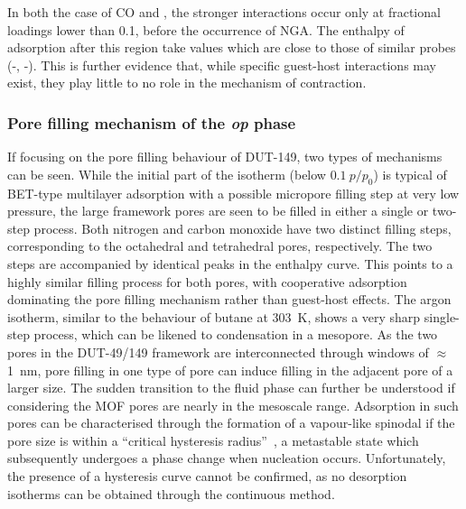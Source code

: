 In both the case of CO and , the 
stronger interactions occur only at fractional loadings lower
than 0.1, before the occurrence of NGA. The enthalpy of 
adsorption after this region take values which are close to
those of similar probes (-, -).
This is further evidence that, while specific guest-host interactions
may exist, they play little to no role in the mechanism of contraction.

\subsubsection{Pore filling mechanism of the \textit{op} phase}

If focusing on the pore filling behaviour of DUT-149, two types
of mechanisms can be seen. While the initial part of the isotherm 
(below \(0.1~p/p_0\)) is typical of BET-type multilayer adsorption
with a possible micropore filling step at very low pressure,
the large framework pores are seen to be filled in either a single or
two-step process.
Both nitrogen and carbon monoxide have two distinct filling
steps, corresponding to the octahedral and tetrahedral pores,
respectively. The two steps are accompanied by identical 
peaks in the enthalpy curve. This points to a highly similar 
filling process for both pores, with cooperative adsorption
dominating the pore filling mechanism rather than guest-host 
effects. The argon isotherm, similar to the behaviour of 
butane at \SI{303}{\kelvin}, shows a very sharp single-step process,
which can be likened to condensation in a mesopore. As the 
two pores in the DUT-49/149 framework are interconnected through 
windows of \(\approx\)\SI{1}{\nano\metre}, pore filling 
in one type of pore can induce filling in the adjacent pore of 
a larger size. The sudden transition to the fluid phase can further
be understood if considering the MOF pores are nearly in the mesoscale 
range. Adsorption in such pores can be characterised through 
the formation of a vapour-like spinodal if the pore size is within
a ``critical hysteresis radius''~\cite{hiratsukaCriticalEnergyBarrier2016},
a metastable state which subsequently undergoes a phase change when
nucleation occurs. Unfortunately, the presence of a hysteresis curve
cannot be confirmed, as no desorption isotherms can be obtained 
through the continuous method.

